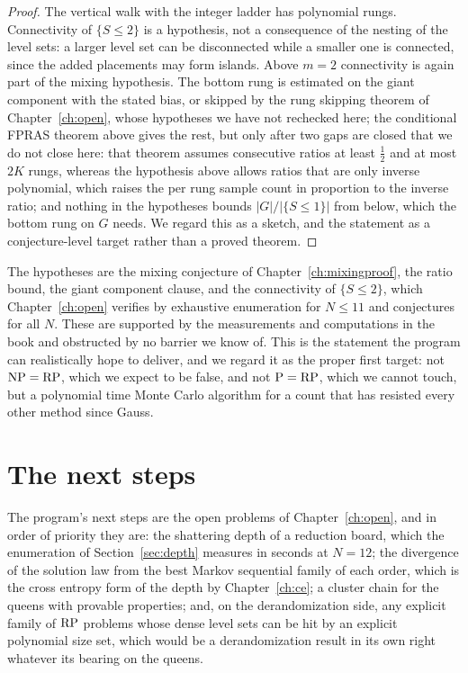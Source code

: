 \begin{proof}
The vertical walk with the integer ladder has polynomial rungs. Connectivity of $\{ S \le 2 \}$ is a hypothesis, not a consequence of the nesting of the level sets: a larger level set can be disconnected while a smaller one is connected, since the added placements may form islands. Above $m = 2$ connectivity is again part of the mixing hypothesis. The bottom rung is estimated on the giant component with the stated bias, or skipped by the rung skipping theorem of Chapter~\ref{ch:open}, whose hypotheses we have not rechecked here; the conditional FPRAS theorem above gives the rest, but only after two gaps are closed that we do not close here: that theorem assumes consecutive ratios at least $\tfrac12$ and at most $2K$ rungs, whereas the hypothesis above allows ratios that are only inverse polynomial, which raises the per rung sample count in proportion to the inverse ratio; and nothing in the hypotheses bounds $|G| / |\{ S \le 1 \}|$ from below, which the bottom rung on $G$ needs. We regard this as a sketch, and the statement as a conjecture-level target rather than a proved theorem.
\end{proof}

The hypotheses are the mixing conjecture of Chapter~\ref{ch:mixingproof}, the ratio bound, the giant component clause, and the connectivity of $\{ S \le 2 \}$, which Chapter~\ref{ch:open} verifies by exhaustive enumeration for $N \le 11$ and conjectures for all $N$. These are supported by the measurements and computations in the book and obstructed by no barrier we know of. This is the statement the program can realistically hope to deliver, and we regard it as the proper first target: not $\mathrm{NP} = \mathrm{RP}$, which we expect to be false, and not $\mathrm{P} = \mathrm{RP}$, which we cannot touch, but a polynomial time Monte Carlo algorithm for a count that has resisted every other method since Gauss.

\section{The next steps}

The program's next steps are the open problems of Chapter~\ref{ch:open}, and in order of priority they are: the shattering depth of a reduction board, which the enumeration of Section~\ref{sec:depth} measures in seconds at $N = 12$; the divergence of the solution law from the best Markov sequential family of each order, which is the cross entropy form of the depth by Chapter~\ref{ch:ce}; a cluster chain for the queens with provable properties; and, on the derandomization side, any explicit family of $\mathrm{RP}$ problems whose dense level sets can be hit by an explicit polynomial size set, which would be a derandomization result in its own right whatever its bearing on the queens.

